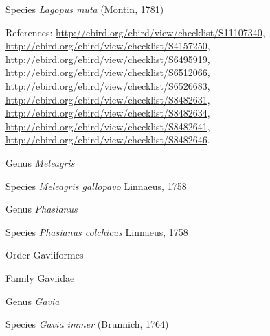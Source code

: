 \documentclass[9pt, article]{memoir}
\begin{document}
\begin{multicols}{2}
\vspace{6pt}\noindent\hspace{36pt}Species \textit{Lagopus muta} (Montin, 1781)


\vspace{6pt}References: 
\url{http://ebird.org/ebird/view/checklist/S11107340}, 
\url{http://ebird.org/ebird/view/checklist/S4157250}, 
\url{http://ebird.org/ebird/view/checklist/S6495919}, 
\url{http://ebird.org/ebird/view/checklist/S6512066}, 
\url{http://ebird.org/ebird/view/checklist/S6526683}, 
\url{http://ebird.org/ebird/view/checklist/S8482631}, 
\url{http://ebird.org/ebird/view/checklist/S8482634}, 
\url{http://ebird.org/ebird/view/checklist/S8482641}, 
\url{http://ebird.org/ebird/view/checklist/S8482646}.

\vspace{6pt}\noindent\hspace{30pt}Genus \textit{Meleagris}


\vspace{6pt}\noindent\hspace{36pt}Species \textit{Meleagris gallopavo} Linnaeus, 1758


\vspace{6pt}\noindent\hspace{30pt}Genus \textit{Phasianus}


\vspace{6pt}\noindent\hspace{36pt}Species \textit{Phasianus colchicus} Linnaeus, 1758


\vspace{6pt}\noindent\hspace{18pt}Order Gaviiformes


\vspace{6pt}\noindent\hspace{24pt}Family Gaviidae


\vspace{6pt}\noindent\hspace{30pt}Genus \textit{Gavia}


\vspace{6pt}\noindent\hspace{36pt}Species \textit{Gavia immer} (Brunnich, 1764)



\end{multicols}
\end{document}
